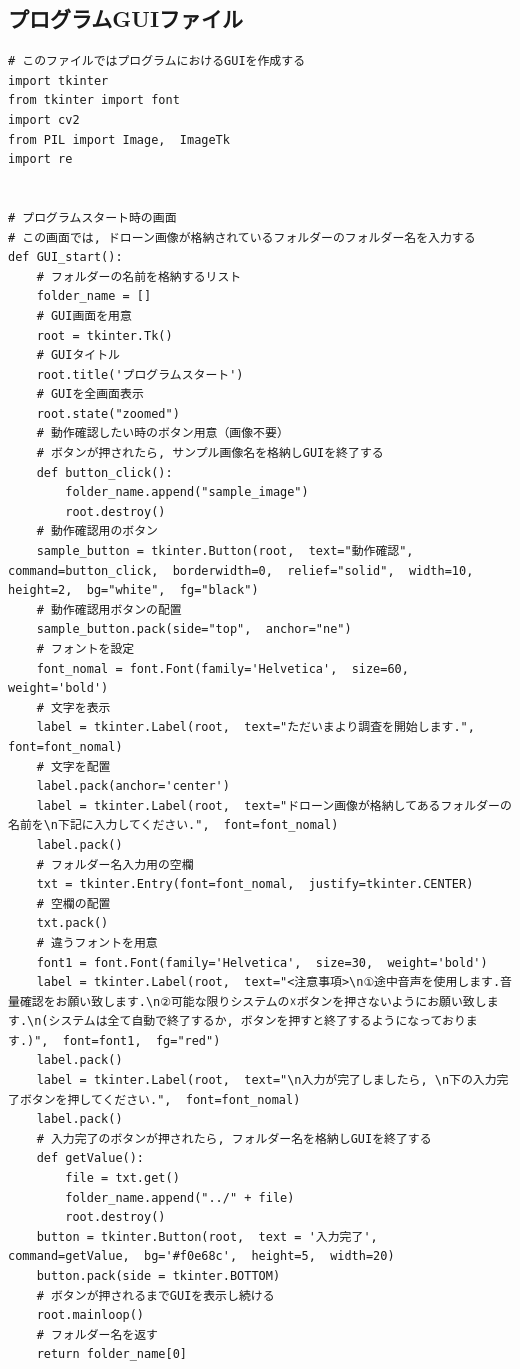 \documentclass[dvipdfmx]{jsarticle}
\begin{document}
\subsection{プログラムGUIファイル}
\begin{lstlisting}
# このファイルではプログラムにおけるGUIを作成する
import tkinter
from tkinter import font
import cv2
from PIL import Image,  ImageTk
import re


# プログラムスタート時の画面
# この画面では, ドローン画像が格納されているフォルダーのフォルダー名を入力する
def GUI_start():
    # フォルダーの名前を格納するリスト
    folder_name = []
    # GUI画面を用意
    root = tkinter.Tk()
    # GUIタイトル
    root.title('プログラムスタート')
    # GUIを全画面表示
    root.state("zoomed")
    # 動作確認したい時のボタン用意（画像不要）
    # ボタンが押されたら, サンプル画像名を格納しGUIを終了する
    def button_click():
        folder_name.append("sample_image")
        root.destroy()
    # 動作確認用のボタン
    sample_button = tkinter.Button(root,  text="動作確認",  command=button_click,  borderwidth=0,  relief="solid",  width=10,  height=2,  bg="white",  fg="black")
    # 動作確認用ボタンの配置
    sample_button.pack(side="top",  anchor="ne")
    # フォントを設定
    font_nomal = font.Font(family='Helvetica',  size=60,  weight='bold')
    # 文字を表示
    label = tkinter.Label(root,  text="ただいまより調査を開始します.",  font=font_nomal)
    # 文字を配置
    label.pack(anchor='center')
    label = tkinter.Label(root,  text="ドローン画像が格納してあるフォルダーの名前を\n下記に入力してください.",  font=font_nomal)
    label.pack()
    # フォルダー名入力用の空欄
    txt = tkinter.Entry(font=font_nomal,  justify=tkinter.CENTER)
    # 空欄の配置
    txt.pack()
    # 違うフォントを用意
    font1 = font.Font(family='Helvetica',  size=30,  weight='bold')
    label = tkinter.Label(root,  text="<注意事項>\n①途中音声を使用します.音量確認をお願い致します.\n②可能な限りシステムの☓ボタンを押さないようにお願い致します.\n(システムは全て自動で終了するか, ボタンを押すと終了するようになっております.)",  font=font1,  fg="red")
    label.pack()
    label = tkinter.Label(root,  text="\n入力が完了しましたら, \n下の入力完了ボタンを押してください.",  font=font_nomal)
    label.pack()
    # 入力完了のボタンが押されたら, フォルダー名を格納しGUIを終了する
    def getValue():
        file = txt.get()
        folder_name.append("../" + file)
        root.destroy()
    button = tkinter.Button(root,  text = '入力完了',  command=getValue,  bg='#f0e68c',  height=5,  width=20)
    button.pack(side = tkinter.BOTTOM)
    # ボタンが押されるまでGUIを表示し続ける
    root.mainloop()
    # フォルダー名を返す
    return folder_name[0]



\end{lstlisting}
\end{document}

